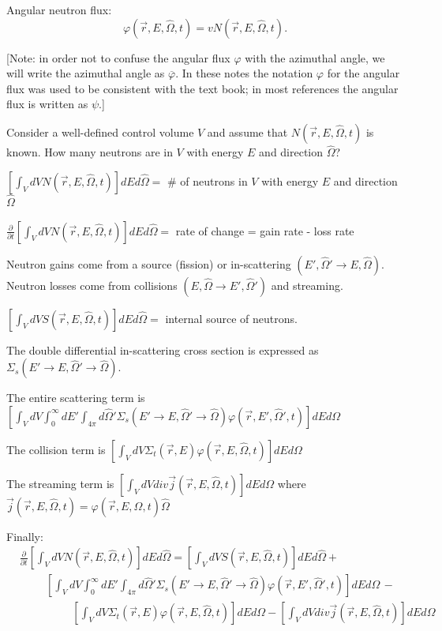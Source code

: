 \documentclass[12pt]{article}
\newcommand{\rvec}{\ensuremath{\vec{r}}}
\newcommand{\omvec}{\ensuremath{\hat{\Omega}}}
\begin{document}
Angular neutron flux:
\[
\varphi(\rvec, E, \omvec, t)=vN(\rvec, E, \omvec, t).
\] 

[Note: in order not to confuse the angular flux $\varphi$ with the azimuthal angle, we will write the azimuthal angle as $\overline{\varphi}$. In these notes the notation $\varphi$ for the angular flux was used to be consistent with the text book; in most references the angular flux is written as $\psi$.]

Consider a well-defined control volume $V$ and assume that $N(\rvec, E, \omvec, t)$ is known. How many neutrons are in $V$ with energy $E$ and direction $\omvec$?

$\left[\int_V dV N(\rvec, E, \omvec, t)\right] dEd\omvec =$ \# of neutrons in $V$ with energy $E$ and direction $\omvec$

$\frac{\partial}{\partial t}\left[\int_V dV N(\rvec, E, \omvec, t)\right] dEd\omvec =$ rate of change  = gain rate - loss rate

Neutron gains come from a source (fission) or in-scattering $(E', \omvec' \rightarrow E, \omvec)$. Neutron losses come from collisions $(E, \omvec \rightarrow E', \omvec')$ and streaming.

$\left[\int_V dV S(\rvec, E, \omvec, t)\right] dEd\omvec =$ internal source of neutrons.

The double differential in-scattering cross section is expressed as $\Sigma_s(E'\rightarrow E, \omvec'\rightarrow\omvec)$.

The entire scattering term is
$\left[\int_VdV\int_0^{\infty}dE'\int_{4\pi}d\omvec'\Sigma_s(E'\rightarrow E,\omvec'\rightarrow\omvec)\varphi(\rvec,E',\omvec',t)\right]dEd\Omega$

The collision term is
$\left[\int_VdV\Sigma_{t}(\rvec,E)\varphi(\rvec,E,\omvec,t)\right]dEd\Omega$

The streaming term is
$\left[\int_VdV div \vec{j}(\rvec, E, \omvec,t)\right]dEd\Omega$ where $\vec{j}(\rvec,E,\omvec,t)=\varphi(\rvec,E,\omvec,t)\omvec$

Finally:
\begin{align*}
&\frac{\partial}{\partial t}\left[\int_V dV N(\rvec, E, \omvec, t)\right] dEd\omvec =
\left[\int_V dV S(\rvec, E, \omvec, t)\right] dEd\omvec +
\\& \hspace{1cm} \left[\int_VdV\int_0^{\infty}dE'\int_{4\pi}d\omvec'\Sigma_s(E'\rightarrow E,\omvec'\rightarrow\omvec)\varphi(\rvec,E',\omvec',t)\right]dEd\Omega \,-
\\& \hspace{2cm}\left[\int_VdV\Sigma_{t}(\rvec,E)\varphi(\rvec,E,\omvec,t)\right]dEd\Omega - \left[\int_VdV div \vec{j}(\rvec, E, \omvec,t)\right]dEd\Omega
\end{align*}
\end{document}
